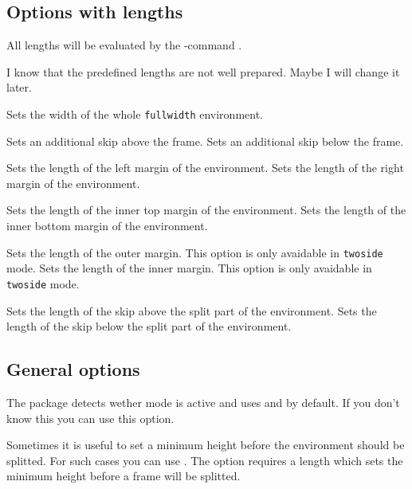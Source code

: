 \documentclass[parskip=false,english,11pt]{ltxmdf}
\def\fwdname{\texttt{fullwidth}\xspace}
\begin{document}
\subsection{Options with lengths}

All lengths will be evaluated by the \eTeX-command .

I know that the predefined lengths are not well prepared. Maybe I will change it later.


 Sets the width of the whole \fwdname environment.

 Sets an additional skip above the frame.
 Sets an additional skip below the frame.

 Sets the length of the left margin of the environment.
 Sets the length of the right margin of the environment.

 Sets the length of the inner top margin of the environment.
 Sets the length of the inner bottom margin of the environment.

 Sets the length of the outer margin. This option is only avaidable in \texttt{twoside} mode.
 Sets the length of the inner margin. This option is only avaidable in \texttt{twoside} mode.


 Sets the length of the skip above the split part of the environment.
 Sets the length of the skip below the split part of the environment.


\subsection{General options}\label{genopt}

 The package detects wether  mode is active and uses  and  by default. If you don't know this you can use this option.

 Sometimes it is useful to set a minimum height before the environment should be splitted. For such cases you can use . The option requires a length which sets the minimum height before a frame will be splitted.
\end{document}
